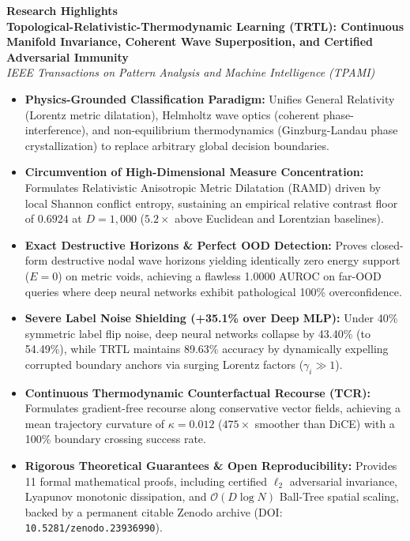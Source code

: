 \documentclass[11pt]{article}
\begin{document}
\pagestyle{empty}

\begin{center}
{\Large \textbf{Research Highlights}}\\[0.3cm]
\textbf{Topological-Relativistic-Thermodynamic Learning (TRTL): Continuous Manifold Invariance, Coherent Wave Superposition, and Certified Adversarial Immunity}\\[0.2cm]
\textit{IEEE Transactions on Pattern Analysis and Machine Intelligence (TPAMI)}
\end{center}

\vspace{0.6cm}

\begin{itemize}
    \item \textbf{Physics-Grounded Classification Paradigm:} Unifies General Relativity (Lorentz metric dilatation), Helmholtz wave optics (coherent phase-interference), and non-equilibrium thermodynamics (Ginzburg-Landau phase crystallization) to replace arbitrary global decision boundaries.

    \item \textbf{Circumvention of High-Dimensional Measure Concentration:} Formulates Relativistic Anisotropic Metric Dilatation (RAMD) driven by local Shannon conflict entropy, sustaining an empirical relative contrast floor of $0.6924$ at $D=1,000$ ($5.2\times$ above Euclidean and Lorentzian baselines).

    \item \textbf{Exact Destructive Horizons \& Perfect OOD Detection:} Proves closed-form destructive nodal wave horizons yielding identically zero energy support ($E=0$) on metric voids, achieving a flawless 1.0000 AUROC on far-OOD queries where deep neural networks exhibit pathological 100\% overconfidence.

    \item \textbf{Severe Label Noise Shielding (+35.1\% over Deep MLP):} Under 40\% symmetric label flip noise, deep neural networks collapse by 43.40\% (to 54.49\%), while TRTL maintains 89.63\% accuracy by dynamically expelling corrupted boundary anchors via surging Lorentz factors ($\gamma_i \gg 1$).

    \item \textbf{Continuous Thermodynamic Counterfactual Recourse (TCR):} Formulates gradient-free recourse along conservative vector fields, achieving a mean trajectory curvature of $\kappa = 0.012$ ($475\times$ smoother than DiCE) with a 100\% boundary crossing success rate.

    \item \textbf{Rigorous Theoretical Guarantees \& Open Reproducibility:} Provides 11 formal mathematical proofs, including certified $\ell_2$ adversarial invariance, Lyapunov monotonic dissipation, and $\mathcal{O}(D \log N)$ Ball-Tree spatial scaling, backed by a permanent citable Zenodo archive (DOI: \texttt{10.5281/zenodo.23936990}).
\end{itemize}
\end{document}
